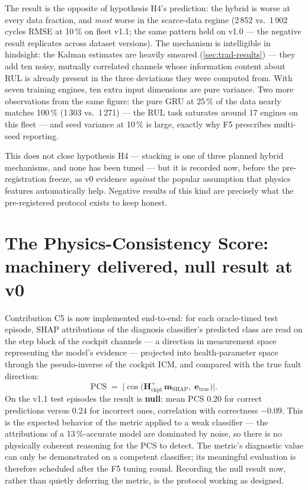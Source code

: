The result is the opposite of hypothesis H4's prediction: the hybrid is worse at every data
fraction, and \emph{most} worse in the scarce-data regime (2\,852 vs.\ 1\,902 cycles RMSE
at 10\,\% on fleet v1.1; the same pattern held on v1.0 --- the negative result replicates
across dataset versions). The mechanism is intelligible in hindsight: the Kalman estimates are heavily smeared
(\cref{sec:trad-results}) --- they add ten noisy, mutually correlated channels whose
information content about RUL is already present in the three deviations they were computed
from. With seven training engines, ten extra input dimensions are pure variance. Two more
observations from the same figure: the pure GRU at 25\,\% of the data nearly matches
100\,\% (1\,303 vs.\ 1\,271) --- the RUL task saturates around 17 engines on this fleet
--- and seed variance at 10\,\% is large, exactly why F5 prescribes multi-seed reporting.

This does not close hypothesis H4 --- stacking is one of three planned hybrid mechanisms, and
none has been tuned --- but it is recorded now, before the pre-registration freeze, as v0
evidence \emph{against} the popular assumption that physics features automatically help.
Negative results of this kind are precisely what the pre-registered protocol exists to keep
honest.

\section{The Physics-Consistency Score: machinery delivered, null result at v0}
\label{sec:pcs}

Contribution C5 is now implemented end-to-end: for each oracle-timed test episode, SHAP
attributions of the diagnosis classifier's predicted class are read on the step block of
the cockpit channels --- a direction in measurement space representing the model's evidence
--- projected into health-parameter space through the pseudo-inverse of the cockpit ICM,
and compared with the true fault direction:
\begin{equation}
  \mathrm{PCS} \;=\; \bigl|\cos\bigl(\mathbf{H}_{\mathrm{ckpt}}^{+}\,
  \mathbf{m}_{\mathrm{SHAP}},\; \mathbf{e}_{\mathrm{true}}\bigr)\bigr|.
\end{equation}
On the v1.1 test episodes the result is \textbf{null}: mean PCS 0.20 for correct
predictions versus 0.24 for incorrect ones, correlation with correctness $-0.09$. This is
the expected behavior of the metric applied to a weak classifier --- the attributions of a
13\,\%-accurate model are dominated by noise, so there is no physically coherent reasoning
for the PCS to detect. The metric's diagnostic value can only be demonstrated on a
competent classifier; its meaningful evaluation is therefore scheduled after the F5 tuning
round. Recording the null result now, rather than quietly deferring the metric, is the
protocol working as designed.


